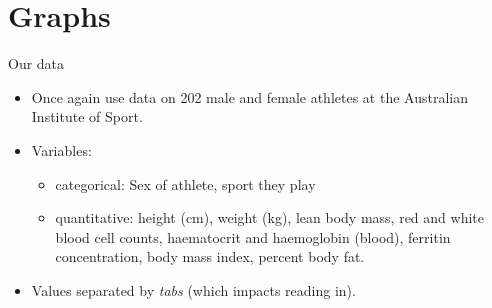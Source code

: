 \documentclass[unknownkeysallowed]{beamer}\usepackage[]{graphicx}\usepackage[]{color}
\begin{document}


\section{Graphs}

\frame{\sectionpage}

\begin{frame}[fragile]{Our data}
  
  \begin{itemize}
  \item Once again use data on 202 male and female athletes at the
    Australian Institute of Sport.
  \item Variables:
    \begin{itemize}
    \item categorical: Sex of athlete, sport they play 
    \item quantitative: height (cm), weight (kg), lean body mass, red
      and white blood cell counts, haematocrit and haemoglobin
      (blood), ferritin concentration, body mass index, percent body
      fat. 
    \end{itemize}
  \item Values separated by \emph{tabs} (which impacts reading in).

  \end{itemize}
  
\end{frame}

\end{document}
